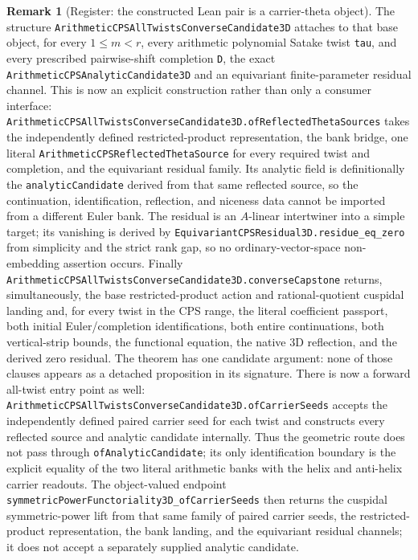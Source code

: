 \documentclass[11pt]{article}
\theoremstyle{definition}
\newtheorem{remark}[theorem]{Remark}
\begin{document}
\begin{remark}[Register: the constructed Lean pair is a carrier-theta object]
The structure \texttt{ArithmeticCPSAllTwistsConverseCandidate3D} attaches to that base object,
for every $1\le m<r$, every arithmetic polynomial Satake twist \texttt{tau}, and every prescribed
pairwise-shift completion \texttt{D}, the exact
\texttt{ArithmeticCPSAnalyticCandidate3D} and an equivariant finite-parameter residual channel.
This is now an explicit construction rather than only a consumer interface:
\texttt{ArithmeticCPSAllTwistsConverseCandidate3D.ofReflectedThetaSources} takes the independently
defined restricted-product representation, the bank bridge, one literal
\texttt{ArithmeticCPSReflectedThetaSource} for every required twist and completion, and the
equivariant residual family.  Its analytic field is definitionally the
\texttt{analyticCandidate} derived from that same reflected source, so the continuation,
identification, reflection, and niceness data cannot be imported from a different Euler bank.
The residual is an $A$-linear intertwiner into a simple target; its vanishing is derived by
\texttt{EquivariantCPSResidual3D.residue\_eq\_zero} from simplicity and the strict rank gap, so
no ordinary-vector-space non-embedding assertion occurs.  Finally
\texttt{ArithmeticCPSAllTwistsConverseCandidate3D.converseCapstone} returns, simultaneously, the
base restricted-product action and rational-quotient cuspidal landing and, for every twist in the
CPS range, the literal coefficient passport, both initial Euler/completion identifications, both
entire continuations, both vertical-strip bounds, the functional equation, the native 3D
reflection, and the derived zero residual.  The theorem has one candidate argument: none of those
clauses appears as a detached proposition in its signature.
There is now a forward all-twist entry point as well:
\texttt{ArithmeticCPSAllTwistsConverseCandidate3D.ofCarrierSeeds} accepts the independently defined
paired carrier seed for each twist and constructs every reflected source and analytic candidate
internally.  Thus the geometric route does not pass through
\texttt{ofAnalyticCandidate}; its only identification boundary is the explicit equality of the two
literal arithmetic banks with the helix and anti-helix carrier readouts.  The object-valued endpoint
\texttt{symmetricPowerFunctoriality3D\_ofCarrierSeeds} then returns the cuspidal symmetric-power
lift from that same family of paired carrier seeds, the restricted-product representation, the bank
landing, and the equivariant residual channels; it does not accept a separately supplied analytic
candidate.


\end{remark}
\end{document}
